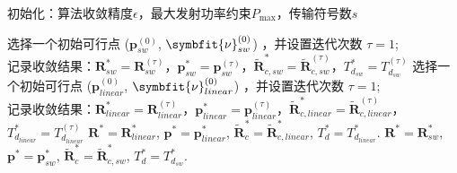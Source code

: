 \begin{algorithm}[h]
		\renewcommand{\thealgocf}{4.1}
	      \caption{面向线性恢复的DSC辅助编码计算结果下行传输算法}\label{algorithm2}
		\LinesNumbered
        初始化：算法收敛精度$\epsilon$，最大发射功率约束$P_{\max}$，传输符号数$s$\;

		选择一个初始可行点 ($\mathbf{p}_{sw}^{(0)}$, $\symbfit{\nu}_{sw}^{(0)}$) ，并设置迭代次数 $\tau=1$;\\
		记录收敛结果：$\mathbf{R}_{sw}^*=\mathbf{R}_{sw}^{(\tau)}$，$\mathbf{p}_{sw}^*=\mathbf{p}_{sw}^{(\tau)}$，$\tilde{\mathbf{R}}_{c,sw}^*=\tilde{\mathbf{R}}_{c,sw}^{(\tau)}$，$T_{d_{sw}}^*=T_{d_{sw}}^{(\tau)}$\;
		选择一个初始可行点 ($\mathbf{p}_{linear}^{(0)}$, $\symbfit{\nu}_{linear}^{(0)}$) ，并设置迭代次数 $\tau=1$;\\
			记录收敛结果：$\mathbf{R}_{linear}^*=\mathbf{R}_{linear}^{(\tau)}$，$\mathbf{p}_{linear}^*=\mathbf{p}_{linear}^{(\tau)}$，$\tilde{\mathbf{R}}_{c,linear}^*=\tilde{\mathbf{R}}_{c,linear}^{(\tau)}$，$T_{d_{linear}}^*=T_{d_{linear}}^{(\tau)}$\;
			{\quad$\mathbf{R}^*=\mathbf{R}_{linear}^*$, $\mathbf{p}^*=\mathbf{p}_{linear}^*$, $\tilde{\mathbf{R}}_c^*=\tilde{\mathbf{R}}_{c,linear}^*$, $T_d^*=T_{d_{linear}}^*$.}
		\Else
		{\quad$\mathbf{R}^*=\mathbf{R}_{sw}^*$, $\mathbf{p}^*=\mathbf{p}_{sw}^*$, $\tilde{\mathbf{R}}_c^*=\tilde{\mathbf{R}}_{c,sw}^*$, $T_d^*=T_{d_{sw}}^*$.}

\end{algorithm}

